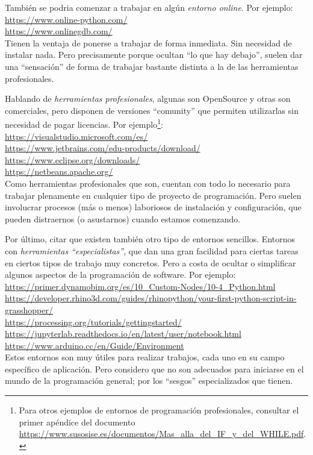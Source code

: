 \documentclass[spanish,12pt,a4paper,final,oneside]{book}
\begin{document}
\vspace{0.3cm}
También se podria comenzar a trabajar en algún \textit{entorno online}. Por ejemplo:
\\ \url{https://www.online-python.com/}
\\ \url{https://www.onlinegdb.com/}
\\Tienen la ventaja de ponerse a trabajar de forma inmediata. Sin necesidad de instalar nada. Pero precisamente porque ocultan ``lo que hay debajo'', suelen dar una ``sensación'' de forma de trabajar bastante distinta a la de las herramientas profesionales.

\vspace{0.3cm}
Hablando de \textit{herramientas profesionales}, algunas son OpenSource y otras son comerciales, pero disponen de versiones ``comunity'' que permiten utilizarlas sin necesidad de pagar licencias. Por ejemplo\footnote{Para otros ejemplos de entornos de programación profesionales, consultar el primer apéndice del documento \url{https://www.susosise.es/documentos/Mas_alla_del_IF_y_del_WHILE.pdf}.}:
\\ \url{https://visualstudio.microsoft.com/es/}
\\ \url{https://www.jetbrains.com/edu-products/download/}
\\ \url{https://www.eclipse.org/downloads/}
\\ \url{https://netbeans.apache.org/}
\\Como herramientas profesionales que son, cuentan con todo lo necesario para trabajar plenamente en cualquier tipo de proyecto de programación. Pero suelen involucrar procesos (más o menos) laboriosos de instalación y configuración, que pueden distraernos (o asustarnos) cuando estamos comenzando.

\vspace{0.3cm}
Por último, citar que existen también otro tipo de entornos sencillos. Entornos con \textit{herramientas ``especialistas''}, que dan una gran facilidad para ciertas tareas en ciertos tipos de trabajo muy concretos. Pero a costa de ocultar o simplificar algunos aspectos de la programación de software. Por ejemplo:
\\ \url{https://primer.dynamobim.org/es/10_Custom-Nodes/10-4_Python.html}
\\ \url{https://developer.rhino3d.com/guides/rhinopython/your-first-python-script-in-grasshopper/}
\\ \url{https://processing.org/tutorials/gettingstarted/}
\\ \url{https://jupyterlab.readthedocs.io/en/latest/user/notebook.html}
\\ \url{https://www.arduino.cc/en/Guide/Environment}
\\Estos entornos son muy útiles para realizar trabajos, cada uno en su campo específico de aplicación. Pero considero que no son adecuados para iniciarse en el mundo de la programación general; por los ``sesgos'' especializados que tienen.
\end{document}
